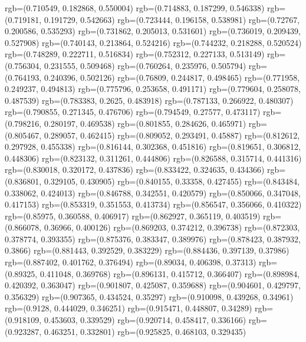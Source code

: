 {{{      rgb=(0.710549, 0.182868, 0.550004)
      rgb=(0.714883, 0.187299, 0.546338)
      rgb=(0.719181, 0.191729, 0.542663)
      rgb=(0.723444, 0.196158, 0.538981)
      rgb=(0.72767, 0.200586, 0.535293)
      rgb=(0.731862, 0.205013, 0.531601)
      rgb=(0.736019, 0.209439, 0.527908)
      rgb=(0.740143, 0.213864, 0.524216)
      rgb=(0.744232, 0.218288, 0.520524)
      rgb=(0.748289, 0.222711, 0.516834)
      rgb=(0.752312, 0.227133, 0.513149)
      rgb=(0.756304, 0.231555, 0.509468)
      rgb=(0.760264, 0.235976, 0.505794)
      rgb=(0.764193, 0.240396, 0.502126)
      rgb=(0.76809, 0.244817, 0.498465)
      rgb=(0.771958, 0.249237, 0.494813)
      rgb=(0.775796, 0.253658, 0.491171)
      rgb=(0.779604, 0.258078, 0.487539)
      rgb=(0.783383, 0.2625, 0.483918)
      rgb=(0.787133, 0.266922, 0.480307)
      rgb=(0.790855, 0.271345, 0.476706)
      rgb=(0.794549, 0.27577, 0.473117)
      rgb=(0.798216, 0.280197, 0.469538)
      rgb=(0.801855, 0.284626, 0.465971)
      rgb=(0.805467, 0.289057, 0.462415)
      rgb=(0.809052, 0.293491, 0.45887)
      rgb=(0.812612, 0.297928, 0.455338)
      rgb=(0.816144, 0.302368, 0.451816)
      rgb=(0.819651, 0.306812, 0.448306)
      rgb=(0.823132, 0.311261, 0.444806)
      rgb=(0.826588, 0.315714, 0.441316)
      rgb=(0.830018, 0.320172, 0.437836)
      rgb=(0.833422, 0.324635, 0.434366)
      rgb=(0.836801, 0.329105, 0.430905)
      rgb=(0.840155, 0.33358, 0.427455)
      rgb=(0.843484, 0.338062, 0.424013)
      rgb=(0.846788, 0.342551, 0.420579)
      rgb=(0.850066, 0.347048, 0.417153)
      rgb=(0.853319, 0.351553, 0.413734)
      rgb=(0.856547, 0.356066, 0.410322)
      rgb=(0.85975, 0.360588, 0.406917)
      rgb=(0.862927, 0.365119, 0.403519)
      rgb=(0.866078, 0.36966, 0.400126)
      rgb=(0.869203, 0.374212, 0.396738)
      rgb=(0.872303, 0.378774, 0.393355)
      rgb=(0.875376, 0.383347, 0.389976)
      rgb=(0.878423, 0.387932, 0.3866)
      rgb=(0.881443, 0.392529, 0.383229)
      rgb=(0.884436, 0.397139, 0.37986)
      rgb=(0.887402, 0.401762, 0.376494)
      rgb=(0.89034, 0.406398, 0.37313)
      rgb=(0.89325, 0.411048, 0.369768)
      rgb=(0.896131, 0.415712, 0.366407)
      rgb=(0.898984, 0.420392, 0.363047)
      rgb=(0.901807, 0.425087, 0.359688)
      rgb=(0.904601, 0.429797, 0.356329)
      rgb=(0.907365, 0.434524, 0.35297)
      rgb=(0.910098, 0.439268, 0.34961)
      rgb=(0.9128, 0.444029, 0.346251)
      rgb=(0.915471, 0.448807, 0.34289)
      rgb=(0.918109, 0.453603, 0.339529)
      rgb=(0.920714, 0.458417, 0.336166)
      rgb=(0.923287, 0.463251, 0.332801)
      rgb=(0.925825, 0.468103, 0.329435)
}}}
